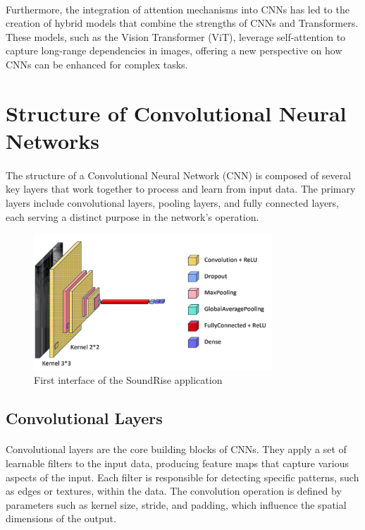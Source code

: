 \paragraph{}
Furthermore, the integration of attention mechanisms into CNNs has led to the creation of hybrid models that combine the strengths of CNNs and Transformers. These models, such as the Vision Transformer (ViT), leverage self-attention to capture long-range dependencies in images, offering a new perspective on how CNNs can be enhanced for complex tasks.

\section{Structure of Convolutional Neural Networks}
\label{sec:cnn-structure}

\paragraph{}
The structure of a Convolutional Neural Network (CNN) is composed of several key layers that work together to process and learn from input data. The primary layers include convolutional layers, pooling layers, and fully connected layers, each serving a distinct purpose in the network's operation.

\begin{figure}[h]
    \centering
    \includegraphics[width=0.8\textwidth]{res/images/cnn/CNNstructure.png}
    \caption{First interface of the SoundRise application}
    \label{fig:soundrise-logo}
\end{figure}

\subsection{Convolutional Layers}
\paragraph{}
Convolutional layers are the core building blocks of CNNs. They apply a set of learnable filters to the input data, producing feature maps that capture various aspects of the input. Each filter is responsible for detecting specific patterns, such as edges or textures, within the data. The convolution operation is defined by parameters such as kernel size, stride, and padding, which influence the spatial dimensions of the output.


